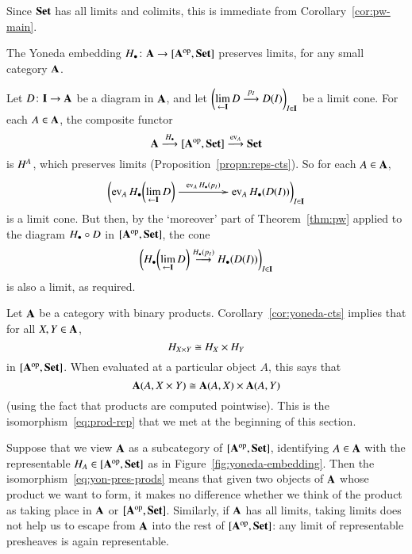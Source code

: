 \begin{pf}
Since $\mathbf{Set}$ has all limits and colimits, this is immediate from
Corollary~\ref{cor:pw-main}.
\end{pf}

\begin{cor}     
\label{cor:yoneda-cts}
%
%
%
The Yoneda embedding $\h_\bl\from \scat{A} \to \pshf{\scat{A}}$ preserves
limits, for any small category $\mathbf{A}$.
\end{cor}

\begin{pf}
Let $D\from \scat{I} \to \scat{A}$ be a diagram in $\mathbf{A}$, and let
$\biggl( \lim\limits_{\leftarrow \mathbf{I}} D \stackrel{p_I}{\longrightarrow} D(I) \biggr)_{I \in \mathbf{I}}$ be a
limit cone.  For each $A \in \mathbf{A}$, the composite functor
\[
\mathbf{A} \stackrel{H_\bullet}{\longrightarrow} [\mathbf{A}^{\mathrm{op}},\mathbf{Set}] \stackrel{\operatorname{ev}_A}{\longrightarrow} \mathbf{Set}
\]
is $H^A$, which preserves limits (Proposition~\ref{propn:reps-cts}).  So for
each $A \in \mathbf{A}$, 
\[
\biggl( 
\ev_A \h_\bl \biggl( \lt{\scat{I}} D \biggr) \,
\xymatrix@1@C+2em{\mbox{} \ar[r]^{\ev_A \h_\bl (p_I)}&\mbox{}}
\ev_A \h_\bl (D(I)) 
\biggr)_{I \in \scat{I}}
\]
is a limit cone.  But then, by the `moreover' part of Theorem~\ref{thm:pw}
applied to the diagram $H_\bullet \mathbin{\circ} D$ in $[\mathbf{A}^{\mathrm{op}},\mathbf{Set}]$, the cone
\[
\biggl( 
H_\bullet \biggl(\lim\limits_{\leftarrow \mathbf{I}} D\biggr)
\stackrel{H_\bullet (p_I)}{\longrightarrow} 
H_\bullet (D(I)) 
\biggr)_{I \in \mathbf{I}}
\]
is also a limit, as required.
\end{pf}

\begin{example}
Let $\mathbf{A}$ be a category with binary products.
Corollary~\ref{cor:yoneda-cts} implies that for all $X, Y \in \mathbf{A}$,
% 
\begin{equation}        
\label{eq:yon-pres-prods}
H_{X \times Y} \cong H_X \times H_Y
\end{equation}
% 
in $[\mathbf{A}^{\mathrm{op}},\mathbf{Set}]$.  When evaluated at a particular object
$A$, this says that
\[
\scat{A}(A, X \times Y) \iso \scat{A}(A, X) \times \scat{A}(A, Y)
%
\index{product!map into}
%
\]
(using the fact that products are computed pointwise).  This is the
isomorphism~\eqref{eq:prod-rep} that we met at the beginning of this
section.

Suppose that we view $\mathbf{A}$ as a subcategory of $[\mathbf{A}^{\mathrm{op}},\mathbf{Set}]$,
identifying $A \in \mathbf{A}$ with the representable $H_A \in
[\mathbf{A}^{\mathrm{op}},\mathbf{Set}]$ as in Figure~\ref{fig:yoneda-embedding}.  Then the
isomorphism~\eqref{eq:yon-pres-prods} means that given two objects of
$\mathbf{A}$ whose product we want to form, it makes no difference whether we
think of the product as taking place in $\mathbf{A}$ or $[\mathbf{A}^{\mathrm{op}},\mathbf{Set}]$.
Similarly, if $\mathbf{A}$ has all limits, taking limits does not help us to
escape from $\mathbf{A}$ into the rest of $[\mathbf{A}^{\mathrm{op}},\mathbf{Set}]$: any limit of
representable presheaves is again representable.%
%
%
\end{example}

